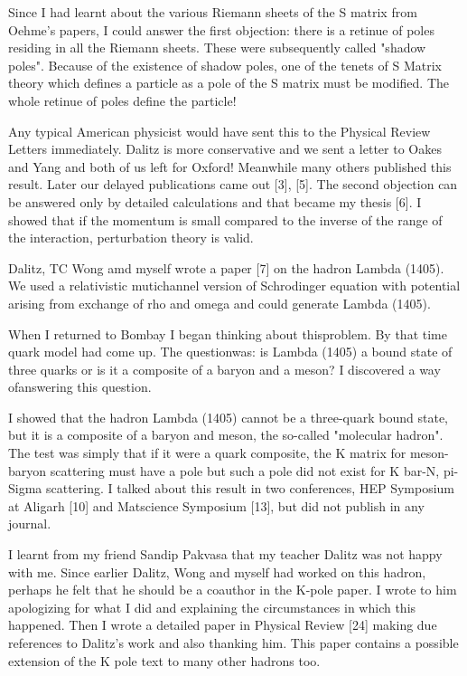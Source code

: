 Since I had learnt about the various Riemann sheets of the S matrix from 
Oehme's papers, I could answer the first objection: there is a retinue 
of poles residing in all the Riemann sheets. These were subsequently 
called "shadow poles". Because of the existence of shadow poles, one of 
the tenets of S Matrix theory which defines a particle as a pole of the 
S matrix must be modified. The whole retinue of poles define the 
particle!

Any typical American physicist would have sent this to the Physical 
Review Letters immediately. Dalitz is more conservative and we sent a 
letter to Oakes and Yang and both of us left for Oxford! Meanwhile many 
others published this result. Later our delayed publications came out 
[3], [5]. The second objection can be answered only by detailed 
calculations and that became my thesis [6]. I showed that if the momentum 
is small compared to the inverse of the range of the interaction, 
perturbation theory is valid.

Dalitz, TC Wong amd myself wrote a paper [7] on the hadron Lambda 
(1405). We used a relativistic mutichannel version of Schrodinger 
equation with potential arising from exchange of rho and omega and could 
generate Lambda (1405).

When I returned to Bombay I began thinking about this\break problem. By that 
time quark model had come up. The question\break was: is Lambda (1405) a bound 
state of three quarks or is it a composite of a baryon and a meson? I 
discovered a way of\break answering this question.

I showed that the hadron Lambda (1405) cannot be a three-quark bound 
state, but it is a composite of a baryon and meson, the so-called 
"molecular hadron". The test was simply that if it were a quark 
composite, the K matrix for meson-baryon scattering must have a pole but 
such a pole did not exist for K bar-N, pi-Sigma scattering. I talked 
about this result in two conferences, HEP Symposium at Aligarh [10] and 
Matscience Symposium [13], but did not publish in any journal.

I learnt from my friend Sandip Pakvasa that my teacher Dalitz was not 
happy with me. Since earlier Dalitz, Wong and myself had worked on this 
hadron, perhaps he felt that he should be a coauthor in the K-pole 
paper. I wrote to him apologizing for what I did and explaining the 
circumstances in which this happened. Then I wrote a detailed paper in 
Physical Review [24] making due references to Dalitz's work and also 
thanking him. This paper contains a possible extension of the K pole 
text to many other hadrons too.

